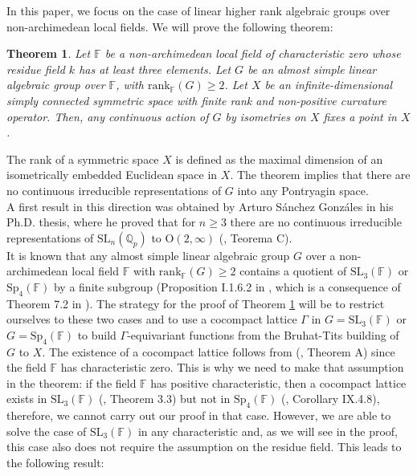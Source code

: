 \documentclass{article}
\theoremstyle{definition}
\theoremstyle{remark}
\theoremstyle{plain}
\newtheorem{thm}[dfn]{Theorem}
\begin{document}
In this paper, we focus on the case of linear higher rank algebraic groups over non-archimedean local fields. We will prove the following theorem:

\begin{thm} \label{Main}
    Let $\mathbb{F}$ be a non-archimedean local field of characteristic zero whose residue field $k$ has at least three elements. Let $G$ be an almost simple linear algebraic group over $\mathbb{F}$, with $\mathrm{rank}_\mathbb{F}(G)\geq 2$. Let $X$ be an infinite-dimensional simply connected symmetric space with finite rank and non-positive curvature operator. Then, any continuous action of $G$ by isometries on $X$ fixes a point in $X$. \\
\end{thm}

The rank of a symmetric space $X$ is defined as the maximal dimension of an isometrically embedded Euclidean space in $X$. The theorem implies that there are no continuous irreducible representations of $G$ into any Pontryagin space. \\

A first result in this direction was obtained by Arturo Sánchez Gonzáles in his Ph.D. thesis, where he proved that for $n\geq 3$ there are no continuous irreducible representations of $\mathrm{SL}_n(\mathbb{Q}_p)$ to $\mathrm{O}(2,\infty)$ (\cite{arturo}, Teorema C). \\

It is known that any almost simple linear algebraic group $G$ over a non-archimedean local field $\mathbb{F}$ with $\mathrm{rank}_\mathbb{F}(G)\geq 2$ contains a quotient of $\mathrm{SL}_3(\mathbb{F})$ or $\mathrm{Sp}_4(\mathbb{F})$ by a finite subgroup (Proposition I.1.6.2 in \cite{margulis}, which is a consequence of Theorem 7.2 in \cite{boreltits1}). The strategy for the proof of Theorem \ref{Main} will be to restrict ourselves to these two cases and to use a cocompact lattice $\Gamma$ in $G=\mathrm{SL}_3(\mathbb{F})$ or $G=\mathrm{Sp}_4(\mathbb{F})$ to build $\Gamma$-equivariant functions from the Bruhat-Tits building of $G$ to $X$. The existence of a cocompact lattice follows from (\cite{borelharder}, Theorem A) since the field $\mathbb{F}$ has characteristic zero. This is why we need to make that assumption in the theorem: if the field $\mathbb{F}$ has positive characteristic, then a cocompact lattice exists in $\mathrm{SL}_3(\mathbb{F})$ (\cite{borelharder}, Theorem 3.3) but not in $\mathrm{Sp}_4(\mathbb{F})$ (\cite{margulis}, Corollary IX.4.8), therefore, we cannot carry out our proof in that case. However, we are able to solve the case of $\mathrm{SL}_3(\mathbb{F})$ in any characteristic and, as we will see in the proof, this case also does not require the assumption on the residue field. This leads to the following result:
\end{document}
